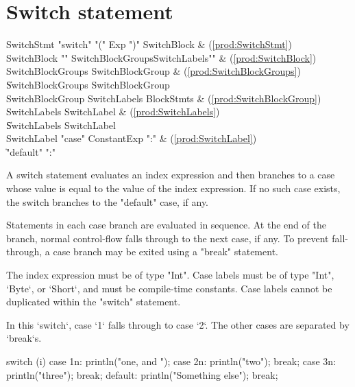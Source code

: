 \section{Switch statement}

\begin{bbgrammar}
          SwitchStmt \: \xcd"switch" \xcd"(" Exp \xcd")" SwitchBlock & (\ref{prod:SwitchStmt}) \\
         SwitchBlock \: \xcd"{" SwitchBlockGroups\opt SwitchLabels\opt \xcd"}" & (\ref{prod:SwitchBlock}) \\
   SwitchBlockGroups \: SwitchBlockGroup & (\ref{prod:SwitchBlockGroups}) \\
                     \| SwitchBlockGroups SwitchBlockGroup \\
    SwitchBlockGroup \: SwitchLabels BlockStmts & (\ref{prod:SwitchBlockGroup}) \\
        SwitchLabels \: SwitchLabel & (\ref{prod:SwitchLabels}) \\
                     \| SwitchLabels SwitchLabel \\
         SwitchLabel \: \xcd"case" ConstantExp \xcd":" & (\ref{prod:SwitchLabel}) \\
                     \| \xcd"default" \xcd":" \\
\end{bbgrammar}

A switch statement evaluates an index expression and then branches to
a case whose value is equal to the value of the index expression.
If no such case exists, the switch branches to the 
\xcd"default" case, if any.

Statements in each case branch are evaluated in sequence.  At the
end of the branch, normal control-flow falls through to the next case, if
any.  To prevent fall-through, a case branch may be exited using
a \xcd"break" statement.

The index expression must be of type \xcd"Int".
Case labels must be of type \xcd"Int", \xcd`Byte`, or \xcd`Short`, 
and must be compile-time 
constants.  Case labels cannot be duplicated within the
\xcd"switch" statement.

\begin{ex}
In this \xcd`switch`, case \xcd`1` falls through to case \xcd`2`.  The
other cases are separated by \xcd`break`s.
\begin{xten}
switch (i) {
  case 1n: println("one, and ");
  case 2n: println("two"); 
          break;
  case 3n: println("three");
          break;
  default: println("Something else");
           break;
}
\end{xten}
\end{ex}

